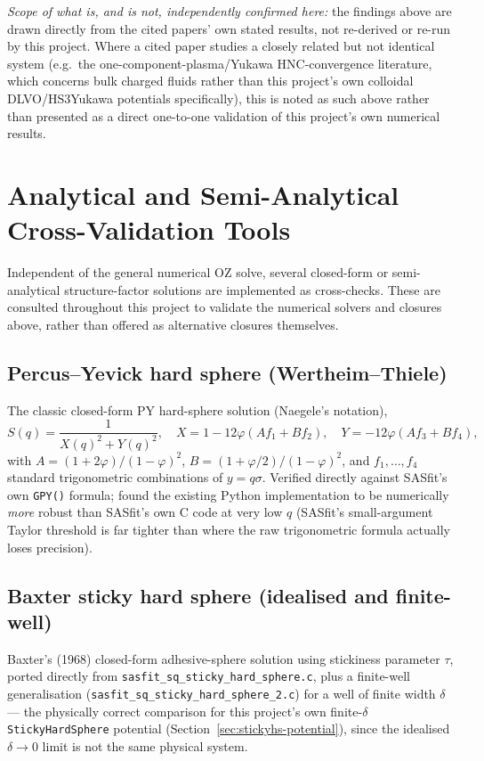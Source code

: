 \documentclass[11pt,a4paper]{article}
\newcommand{\code}[1]{\texttt{#1}}
\begin{document}
\emph{Scope of what is, and is not, independently confirmed here:} the
findings above are drawn directly from the cited papers' own stated
results, not re-derived or re-run by this project. Where a cited paper
studies a closely related but not identical system (e.g.\ the
one-component-plasma/Yukawa HNC-convergence literature, which concerns bulk
charged fluids rather than this project's own colloidal DLVO/HS3Yukawa
potentials specifically), this is noted as such above rather than presented
as a direct one-to-one validation of this project's own numerical results.



\clearpage
\section{Analytical and Semi-Analytical Cross-Validation Tools}
\label{sec:analytical}

Independent of the general numerical OZ solve, several closed-form or
semi-analytical structure-factor solutions are implemented as cross-checks.
These are consulted throughout this project to validate the numerical solvers
and closures above, rather than offered as alternative closures themselves.

\subsection{Percus--Yevick hard sphere (Wertheim--Thiele)}
The classic closed-form PY hard-sphere solution (Naegele's notation),
\begin{equation}
  S(q) = \frac{1}{X(q)^2+Y(q)^2}, \quad
  X = 1-12\varphi(Af_1+Bf_2), \quad Y = -12\varphi(Af_3+Bf_4),
\end{equation}
with $A=(1+2\varphi)/(1-\varphi)^2$, $B=(1+\varphi/2)/(1-\varphi)^2$, and
$f_1,\dots,f_4$ standard trigonometric combinations of $y=q\sigma$. Verified
directly against SASfit's own \code{GPY()} formula; found the existing Python
implementation to be numerically \emph{more} robust than SASfit's own C code
at very low $q$ (SASfit's small-argument Taylor threshold is far tighter than
where the raw trigonometric formula actually loses precision).

\subsection{Baxter sticky hard sphere (idealised and finite-well)}
Baxter's (1968) closed-form adhesive-sphere solution using stickiness
parameter $\tau$, ported directly from
\code{sasfit\_sq\_sticky\_hard\_sphere.c}, plus a finite-well generalisation
(\code{sasfit\_sq\_sticky\_hard\_sphere\_2.c}) for a well of finite width
$\delta$ --- the physically correct comparison for this project's own
finite-$\delta$ \code{StickyHardSphere} potential (Section~\ref{sec:stickyhs-potential}),
since the idealised $\delta\to0$ limit is not the same physical system.
\end{document}
